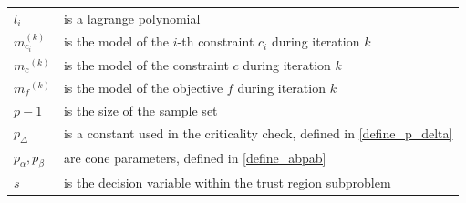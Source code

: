 \documentclass{article}
\theoremstyle{case}
\numberwithin{theorem}{subsection}
\newcommand{\mcik}{{{m}^{(k)}_{c_i}}}
\newcommand{\mck}{{{m}_{c}}^{(k)}}
\newcommand{\mfk}{{{m}_f}^{(k)}}
\begin{document}
\begin{longtable}{| p{} | p{} |}
$l_i$ & is a lagrange polynomial \\ %
$\mcik$ & is the model of the $i$-th constraint $c_i$ during iteration $k$\\ %
$\mck$ & is the model of the constraint $c$ during iteration $k$\\ %
$\mfk$ & is the model of the objective $f$ during iteration $k$\\ %
$p-1$ & is the size of the sample set \\ %
$p_{\Delta}$ & is a constant used in the criticality check, defined in  \cref{define_p_delta} \\ %
$p_{\alpha}, p_{\beta}$ & are cone parameters, defined in \cref{define_abpab} \\ %
$s$ & is the decision variable within the trust region subproblem \\ %

\end{longtable}
\end{document}
